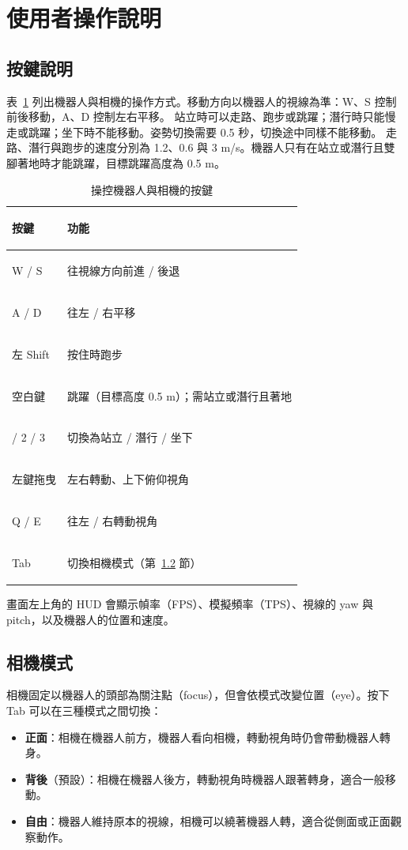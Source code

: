 \section{使用者操作說明}
\label{sec:manual}

\subsection{按鍵說明}
\label{sec:controls}

表~\ref{tab:controls} 列出機器人與相機的操作方式。移動方向以機器人的視線為準：W、S 控制前後移動，A、D 控制左右平移。
站立時可以走路、跑步或跳躍；潛行時只能慢走或跳躍；坐下時不能移動。姿勢切換需要 0.5 秒，切換途中同樣不能移動。
走路、潛行與跑步的速度分別為 1.2、0.6 與 3 m/s。機器人只有在站立或潛行且雙腳著地時才能跳躍，目標跳躍高度為 0.5 m。

\begin{table}[htbp]
    \centering
    \caption{操控機器人與相機的按鍵}
    \label{tab:controls}
    \small
    \begin{tabularx}{\textwidth}{>{\bfseries\raggedright\arraybackslash}p{} X}
        \toprule
        按鍵        & 功能                                 \\
        \midrule
        W / S     & 往視線方向前進 / 後退                       \\
        A / D     & 往左 / 右平移                           \\
        左 Shift   & 按住時跑步                              \\
        空白鍵       & 跳躍（目標高度 0.5 m）；需站立或潛行且著地           \\
        1 / 2 / 3 & 切換為站立 / 潛行 / 坐下                    \\
        左鍵拖曳      & 左右轉動、上下俯仰視角                        \\
        Q / E     & 往左 / 右轉動視角                         \\
        Tab       & 切換相機模式（第~\ref{sec:camera-modes} 節） \\
        \bottomrule
    \end{tabularx}
\end{table}

畫面左上角的 HUD 會顯示幀率（FPS）、模擬頻率（TPS）、視線的 yaw 與 pitch，以及機器人的位置和速度。

\subsection{相機模式}
\label{sec:camera-modes}

相機固定以機器人的頭部為關注點（focus），但會依模式改變位置（eye）。按下 Tab 可以在三種模式之間切換：

\begin{itemize}
    \item \textbf{正面}：相機在機器人前方，機器人看向相機，轉動視角時仍會帶動機器人轉身。
    \item \textbf{背後}（預設）：相機在機器人後方，轉動視角時機器人跟著轉身，適合一般移動。
    \item \textbf{自由}：機器人維持原本的視線，相機可以繞著機器人轉，適合從側面或正面觀察動作。
\end{itemize}
